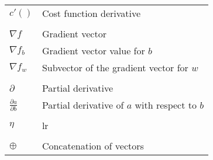 \begin{tabular}{@{}ll@{}}
$c'()$ & Cost function derivative \\
\\
$\nabla f$ & Gradient vector \\
$\nabla f_b$ & Gradient vector value for $b$\\
$\nabla f_w$ & Subvector of the gradient vector for $w$\\
\\
$\partial$ & Partial derivative\\
$\frac{\partial a}{\partial b}$ & Partial derivative of $a$ with respect to $b$ \\
\\
$\eta$ & \acrlong{lr} \\
\\

$\oplus$ & Concatenation of vectors
\end{tabular}